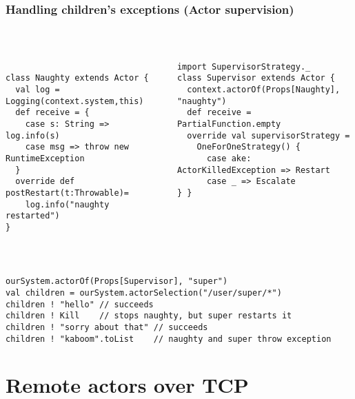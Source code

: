 \documentclass[aspectratio=169]{beamer}
\begin{document}
\begin{frame}[fragile]\frametitle{Handling children's exceptions (Actor supervision)}
~\\[-10mm]
\begin{columns}[t]
\begin{column}{0.54\textwidth}
\begin{lstlisting}[emph={Actor, Logging, Props, ourSystem,terminate,sleep,actorOf,receive, watch,stop,Terminated}]

class Naughty extends Actor {
  val log = Logging(context.system,this)
  def receive = {
    case s: String => log.info(s)
    case msg => throw new RuntimeException
  }
  override def postRestart(t:Throwable)=
    log.info("naughty restarted")
}
\end{lstlisting}
\end{column}
\begin{column}{0.50\textwidth}
\begin{lstlisting}[emph={Actor, Logging, Props, ourSystem,terminate,sleep,actorOf,receive,become,stop,supervisorStrategy}]
import SupervisorStrategy._
class Supervisor extends Actor {
  context.actorOf(Props[Naughty], "naughty")
  def receive = PartialFunction.empty
  override val supervisorStrategy =
    OneForOneStrategy() {
      case ake: ActorKilledException => Restart
      case _ => Escalate
} }
\end{lstlisting}
\end{column}
\end{columns}
~\\[-4pt]
\begin{lstlisting}[emph={Actor, Logging, Props, ourSystem,terminate,sleep,actorOf,receive,become,stop}]
ourSystem.actorOf(Props[Supervisor], "super")
val children = ourSystem.actorSelection("/user/super/*")
children ! "hello" // succeeds
children ! Kill    // stops naughty, but super restarts it
children ! "sorry about that" // succeeds
children ! "kaboom".toList    // naughty and super throw exception
\end{lstlisting}
\end{frame}

\section{Remote actors over TCP}
\end{document}
